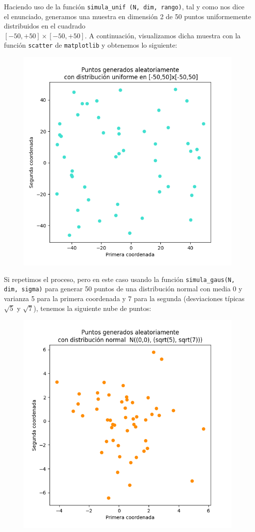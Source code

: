 \documentclass[a4]{article}
\begin{document}
Haciendo uso de la función \lstinline|simula_unif (N, dim, rango)|, tal y como nos dice el enunciado, generamos una muestra en dimensión 2 de 50 puntos uniformemente distribuidos en el cuadrado \\ $ [-50, +50]\times [-50, +50] $. A continuación, visualizamos dicha muestra con la función \lstinline|scatter| de \lstinline|matplotlib| y obtenemos lo siguiente:
\begin{figure}[H]
	\centering
	\includegraphics[width=0.6\linewidth]{img/Figure_1}
	\caption{}
	\label{fig:figure1}
\end{figure}
Si repetimos el proceso, pero en este caso usando la función \lstinline|simula_gaus(N, dim, sigma)| para generar 50 puntos de una distribución normal con media 0 y varianza 5 para la primera coordenada y 7 para la segunda (desviaciones típicas $\sqrt{5}$ y $ \sqrt{7} $), tenemos la siguiente nube de puntos:
\begin{figure}[H]
	\centering
	\includegraphics[width=0.6\linewidth]{img/Figure_2}
	\caption{}
	\label{fig:figure2}
\end{figure}
\end{document}
